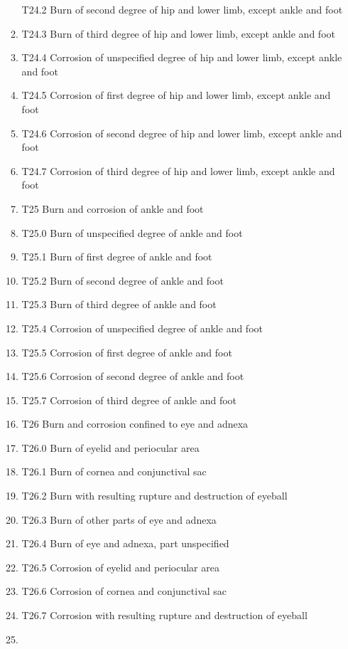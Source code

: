 \documentclass[
]{scrartcl}
\begin{document}
\begin{itemize}
\begin{enumerate}
    T24.2 Burn of second degree of hip and lower limb, except ankle and
    foot
  \item
    T24.3 Burn of third degree of hip and lower limb, except ankle and
    foot
  \item
    T24.4 Corrosion of unspecified degree of hip and lower limb, except
    ankle and foot
  \item
    T24.5 Corrosion of first degree of hip and lower limb, except ankle
    and foot
  \item
    T24.6 Corrosion of second degree of hip and lower limb, except ankle
    and foot
  \item
    T24.7 Corrosion of third degree of hip and lower limb, except ankle
    and foot
  \item
    T25 Burn and corrosion of ankle and foot
  \item
    T25.0 Burn of unspecified degree of ankle and foot
  \item
    T25.1 Burn of first degree of ankle and foot
  \item
    T25.2 Burn of second degree of ankle and foot
  \item
    T25.3 Burn of third degree of ankle and foot
  \item
    T25.4 Corrosion of unspecified degree of ankle and foot
  \item
    T25.5 Corrosion of first degree of ankle and foot
  \item
    T25.6 Corrosion of second degree of ankle and foot
  \item
    T25.7 Corrosion of third degree of ankle and foot
  \item
    T26 Burn and corrosion confined to eye and adnexa
  \item
    T26.0 Burn of eyelid and periocular area
  \item
    T26.1 Burn of cornea and conjunctival sac
  \item
    T26.2 Burn with resulting rupture and destruction of eyeball
  \item
    T26.3 Burn of other parts of eye and adnexa
  \item
    T26.4 Burn of eye and adnexa, part unspecified
  \item
    T26.5 Corrosion of eyelid and periocular area
  \item
    T26.6 Corrosion of cornea and conjunctival sac
  \item
    T26.7 Corrosion with resulting rupture and destruction of eyeball
  \item

\end{enumerate}
\end{itemize}
\end{document}
